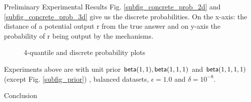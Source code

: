 \documentclass[final,hyperref={pdfpagelabels=false}]{beamer}
\begin{document}
\begin{frame}[t]
\begin{columns}[t]
\begin{column}{.485\textwidth}
\begin{block}{Preliminary Experimental Results}
Fig. \ref{subfig_concrete_prob_2d} and \ref{subfig_concrete_prob_3d} give us the discrete probabilities. On the x-axis: the distance of a potential output r from the true answer and on y-axis the probability of r being output by the mechanisms.
\begin{figure}[H]
\begin{center}
\centering
\caption{4-quantile and discrete probability plots}
\label{fig_concrete_prob}
\end{center}
\end{figure}
\scriptsize{Experiments above are with unit prior $\mathsf{beta}(1,1), \mathsf{beta}(1,1,1)$ and $\mathsf{beta}(1,1,1,1)$ (except Fig. \ref{subfig_prior}) , balanced datasets, $\epsilon = 1.0$ and $\delta = 10^{-8}$.}
\end{block}




\begin{block}{Conclusion}


\end{block}
\end{column}
\end{columns}
\end{frame}
\end{document}
